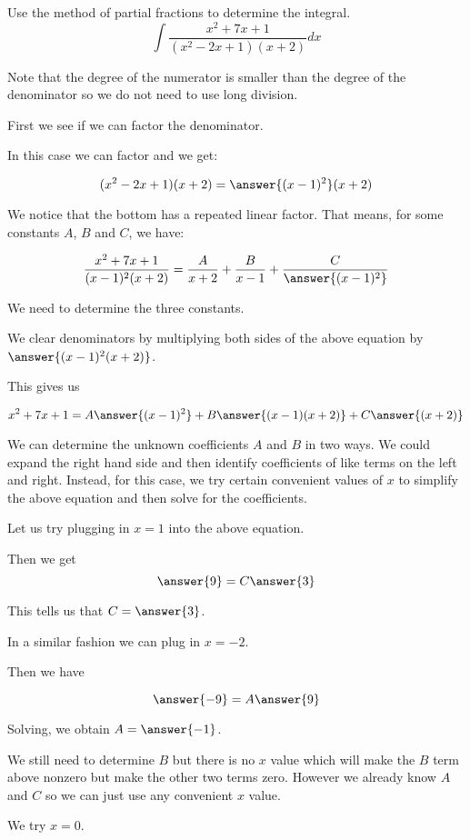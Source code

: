 \documentclass{ximera}
\author{Jason Miller}
\begin{document}
\begin{exercise}
Use the method of partial fractions to determine the integral.
\[
\int \frac{x^{2}+7x+1}{(x^{2}-2x+1)(x+2)} dx
\]

Note that the degree of the numerator is smaller than the degree of the denominator so we do not need 
to use long division. 

First we see if we can factor the denominator. 

In this case we can factor and we get:

\[
(x^{2}-2x+1)(x+2)=\answer{(x-1)^{2}}(x+2)
\]

\begin{exercise} 

We notice that the bottom has a repeated linear factor. That means, for some constants $A$, $B$ and $C$, we have:

\[
\frac{x^{2}+7x+1}{(x-1)^{2}(x+2)}= \frac{A}{x+2} + \frac{B}{x-1} +\frac{C}{\answer{(x-1)^{2}}}
\]

We need to determine the three constants. 

We clear denominators by multiplying both sides of the above equation by $\answer{(x-1)^{2}(x+2)}$. 

This gives us 

\[
x^{2}+7x+1=A\answer{ (x-1)^{2}} + B\answer{ (x-1)(x+2)} +  C\answer{ (x+2)}
\]

We can determine the unknown coefficients $A$ and $B$ in two ways. 
We could expand the right hand side and then identify coefficients of like terms on the left and right.
Instead, for this case, we try certain convenient values of $x$ to simplify the above equation and then solve for the coefficients. 

Let us try plugging in $x=1$ into the above equation. 

Then we get 
\[
\answer{9 }= C\answer{3}
\]

This tells us that $C=\answer{ 3}$. 


In a similar fashion we can plug in $x=-2$. 

Then we have 

\[
\answer{-9}=A\answer{9}
\]

Solving, we obtain $A=\answer{-1}$. 

We still need to determine $B$ but there is no $x$ value which will make the $B$ term above nonzero but make the other two terms zero. 
However we already know $A$ and $C$ so we can just use any convenient $x$ value.

We try $x=0$. 


\end{exercise}
\end{exercise}
\end{document}
